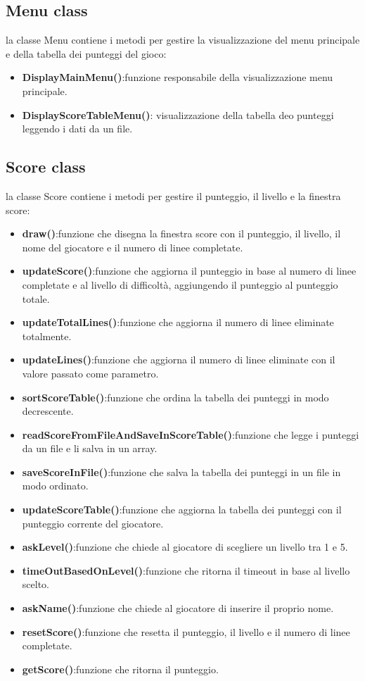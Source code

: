 \documentclass{article}
\begin{document}
\subsection{Menu class}
la classe Menu contiene i metodi per gestire la visualizzazione del menu principale e della tabella dei punteggi del gioco:
\begin{itemize}
    \item \textbf{DisplayMainMenu()}:funzione responsabile della visualizzazione menu principale.
    \item \textbf{DisplayScoreTableMenu()}: visualizzazione della tabella deo punteggi leggendo i dati da un file.
\end{itemize}

\subsection{Score class}
la classe Score contiene i metodi per gestire il punteggio, il livello e la finestra score:

\begin{itemize}
    \item \textbf{draw()}:funzione che disegna la finestra score con il punteggio, il livello, il nome del giocatore e il numero di linee completate.
    \item \textbf{updateScore()}:funzione che aggiorna il punteggio in base al numero di linee completate e al livello di difficoltà, aggiungendo il punteggio al punteggio totale.
    \item \textbf{updateTotalLines()}:funzione che aggiorna il numero di linee eliminate totalmente.
    \item \textbf{updateLines()}:funzione che aggiorna il numero di linee eliminate con il valore passato come parametro.
    \item \textbf{sortScoreTable()}:funzione che ordina la tabella dei punteggi in modo decrescente.
    \item \textbf{readScoreFromFileAndSaveInScoreTable()}:funzione che legge i punteggi da un file e li salva in un array.
    \item \textbf{saveScoreInFile()}:funzione che salva la tabella dei punteggi in un file in modo ordinato.
    \item \textbf{updateScoreTable()}:funzione che aggiorna la tabella dei punteggi con il punteggio corrente del giocatore.
    \item \textbf{askLevel()}:funzione che chiede al giocatore di scegliere un livello tra 1 e 5.
    \item \textbf{timeOutBasedOnLevel()}:funzione che ritorna il timeout in base al livello scelto.
    \item \textbf{askName()}:funzione che chiede al giocatore di inserire il proprio nome.
    \item \textbf{resetScore()}:funzione che resetta il punteggio, il livello e il numero di linee completate.
    \item \textbf{getScore()}:funzione che ritorna il punteggio.
\end{itemize}
\end{document}
